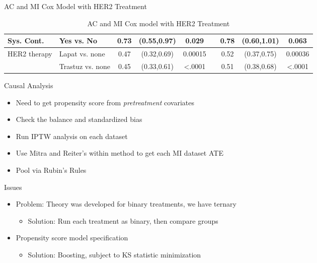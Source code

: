 \begin{frame}{AC and MI Cox Model with HER2 Treatment}
\begin{table}[]
{\begin{tabular}{|l|l|c|c|c|c|c|c|c|}
Sys. Cont.                     & Yes vs. No                       & 0.73                  & (0.55,0.97)                                        & 0.029                 &                       & 0.78 & (0.60,1.01)                                                          & 0.063                                                       \\ \hline
HER2 therapy                   & Lapat vs. none                   & 0.47                  & (0.32,0.69)                                        & 0.00015               &                       & 0.52 & (0.37,0.75)                                                          & 0.00036                                                     \\ \hline
                               & Trastuz vs. none                 & 0.45                  & (0.33,0.61)                                        & \textless.0001        &                       & 0.51 & (0.38,0.68)                                                          & \textless.0001                                              \\ \hline
\end{tabular}
}
\caption{AC and MI Cox model with HER2 Treatment}

\end{table}
\end{frame}

\begin{frame}{Causal Analysis}
\begin{itemize}
 \item Need to get propensity score from \textit{pretreatment} covariates
 \item Check the balance and standardized bias
 \item Run IPTW analysis on each dataset
 \item Use Mitra and Reiter's within method to get each MI dataset ATE \cite{Mitra2012}
 \item Pool via Rubin's Rules
\end{itemize}
\end{frame}

 
\begin{frame}{Issues}
\begin{itemize}
 \item Problem: Theory was developed for binary treatments, we have ternary
 \begin{itemize}
  \item Solution: Run each treatment as binary, then compare groups
 \end{itemize}
\item Propensity score model specification
\begin{itemize}
 \item Solution: Boosting, subject to KS statistic minimization
\end{itemize}
\end{itemize}
 
\end{frame}


